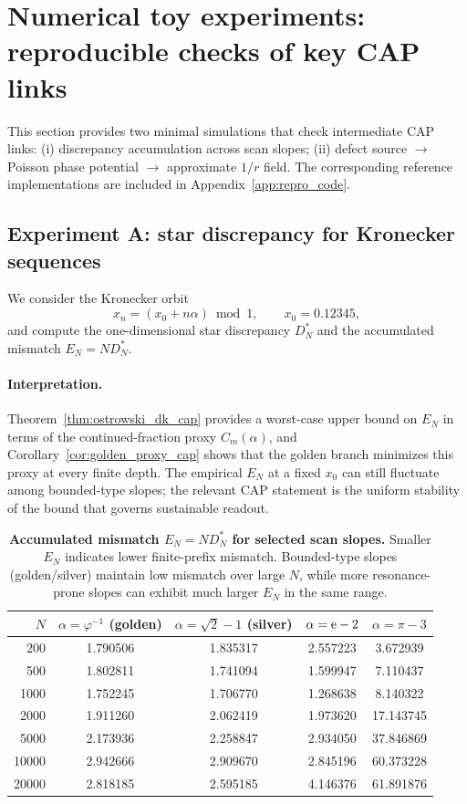 \section{Numerical toy experiments: reproducible checks of key CAP links}
\label{sec:numerics}

This section provides two minimal simulations that check intermediate CAP links: (i) discrepancy accumulation across scan slopes; (ii) defect source $\to$ Poisson phase potential $\to$ approximate $1/r$ field.
The corresponding reference implementations are included in Appendix~\ref{app:repro_code}.

\subsection{Experiment A: star discrepancy for Kronecker sequences}
\label{subsec:expA}

We consider the Kronecker orbit
\begin{equation}
  x_n = (x_0 + n\alpha)\bmod 1,
  \qquad x_0=0.12345,
\end{equation}
and compute the one-dimensional star discrepancy $D_N^\ast$ and the accumulated mismatch $E_N=ND_N^\ast$.

\paragraph{Interpretation.}
Theorem~\ref{thm:ostrowski_dk_cap} provides a worst-case upper bound on $E_N$ in terms of the continued-fraction proxy $C_m(\alpha)$, and Corollary~\ref{cor:golden_proxy_cap} shows that the golden branch minimizes this proxy at every finite depth. The empirical $E_N$ at a fixed $x_0$ can still fluctuate among bounded-type slopes; the relevant CAP statement is the uniform stability of the bound that governs sustainable readout.

\begin{table}[t]
\centering
\begin{tabular}{@{}rcccc@{}}
\toprule
$N$ & $\alpha=\varphi^{-1}$ (golden) & $\alpha=\sqrt{2}-1$ (silver) & $\alpha=\mathrm{e}-2$ & $\alpha=\pi-3$ \\
\midrule
200   & 1.790506 & 1.835317 & 2.557223 & 3.672939 \\
500   & 1.802811 & 1.741094 & 1.599947 & 7.110437 \\
1000  & 1.752245 & 1.706770 & 1.268638 & 8.140322 \\
2000  & 1.911260 & 2.062419 & 1.973620 & 17.143745 \\
5000  & 2.173936 & 2.258847 & 2.934050 & 37.846869 \\
10000 & 2.942666 & 2.909670 & 2.845196 & 60.373228 \\
20000 & 2.818185 & 2.595185 & 4.146376 & 61.891876 \\
\bottomrule
\end{tabular}
\caption{\textbf{Accumulated mismatch $E_N=ND_N^\ast$ for selected scan slopes.} Smaller $E_N$ indicates lower finite-prefix mismatch. Bounded-type slopes (golden/silver) maintain low mismatch over large $N$, while more resonance-prone slopes can exhibit much larger $E_N$ in the same range.}
\label{tab:EN}
\end{table}

